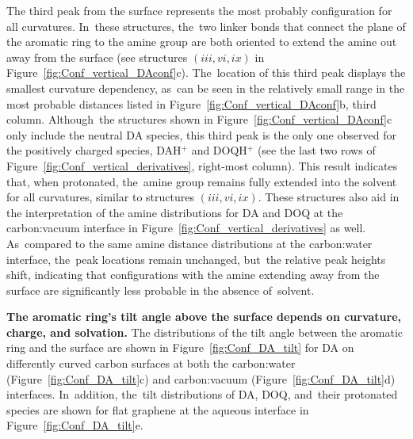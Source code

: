 \documentclass[molecules,article,accept,pdftex,moreauthors]{Definitions/mdpi}
\begin{document}
The third peak from the surface represents the most probably configuration for all curvatures. In~these structures, the~two linker bonds that connect the plane of the aromatic ring to the amine group are both oriented to extend the amine out away from the surface (see structures $(iii, vi, ix)$ in Figure~\ref{fig:Conf_vertical_DAconf}c). The~location of this third peak displays the smallest curvature dependency, as~can be seen in the relatively small range in the most probable distances listed in Figure~\ref{fig:Conf_vertical_DAconf}b, third column. Although~the structures shown in Figure~\ref{fig:Conf_vertical_DAconf}c only include the neutral DA species, this third peak is the only one observed for the positively charged species, DAH$^+$ and DOQH$^+$ (see the last two rows of Figure~\ref{fig:Conf_vertical_derivatives}, right-most column). This result indicates that, when protonated, the~amine group remains fully extended into the solvent for all curvatures, similar to structures $(iii, vi, ix)$. These structures also aid in the interpretation of the amine distributions for DA and DOQ at the carbon:vacuum interface in Figure~\ref{fig:Conf_vertical_derivatives} as well. As~compared to the same amine distance distributions at the carbon:water interface, the~peak locations remain unchanged, but~the relative peak heights shift, indicating that configurations with the amine extending away from the surface are significantly less probable in the absence of~solvent.



{\bf The aromatic ring's tilt angle above the surface depends on curvature, charge, and solvation.} %
The distributions of the tilt angle between the aromatic ring and the surface are shown in Figure~\ref{fig:Conf_DA_tilt} for DA on differently curved carbon surfaces at both the carbon:water (Figure~\ref{fig:Conf_DA_tilt}c) and carbon:vacuum (Figure~\ref{fig:Conf_DA_tilt}d) interfaces. In~addition, the~tilt distributions of DA, DOQ, and~their protonated species are shown for flat graphene at the aqueous interface in Figure~\ref{fig:Conf_DA_tilt}e.
\end{document}
